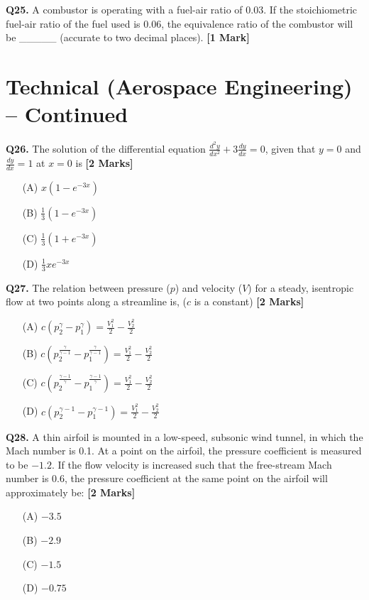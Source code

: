 \documentclass[11pt]{article}
\newcommand{\questiona}[2]{
    \noindent\textbf{Q#2.} #1 \hfill \textbf{[1 Mark]}
}
\newcommand{\questionb}[2]{
    \noindent\textbf{Q#2.} #1 \hfill \textbf{[2 Marks]}
}
\begin{document}
\vspace{0.5cm}

\questiona{A combustor is operating with a fuel-air ratio of 0.03. If the stoichiometric fuel-air ratio of the fuel used is 0.06, the equivalence ratio of the combustor will be \_\_\_\_\_ (accurate to two decimal places).}{25}

\vspace{0.5cm}

\section*{Technical (Aerospace Engineering) -- Continued}

\questionb{The solution of the differential equation $\frac{d^2y}{dx^2} + 3\frac{dy}{dx} = 0$, given that $y = 0$ and $\frac{dy}{dx} = 1$ at $x = 0$ is}{26}
\begin{enumerate}
    \item[(A)] $x(1 - e^{-3x})$  
    \item[(B)] $\frac{1}{3}(1 - e^{-3x})$  
    \item[(C)] $\frac{1}{3}(1 + e^{-3x})$  
    \item[(D)] $\frac{1}{3}xe^{-3x}$  
\end{enumerate}

\vspace{0.5cm}

\questionb{The relation between pressure ($p$) and velocity ($V$) for a steady, isentropic flow at two points along a streamline is, ($c$ is a constant)}{27}
\begin{enumerate}
    \item[(A)] $c(p_2^{\gamma} - p_1^{\gamma}) = \frac{V_1^2}{2} - \frac{V_2^2}{2}$  
    \item[(B)] $c(p_2^{\frac{\gamma}{\gamma-1}} - p_1^{\frac{\gamma}{\gamma-1}}) = \frac{V_1^2}{2} - \frac{V_2^2}{2}$  
    \item[(C)] $c(p_2^{\frac{\gamma - 1}{\gamma}} - p_1^{\frac{\gamma - 1}{\gamma}}) = \frac{V_1^2}{2} - \frac{V_2^2}{2}$  
    \item[(D)] $c(p_2^{\gamma - 1} - p_1^{\gamma - 1}) = \frac{V_1^2}{2} - \frac{V_2^2}{2}$  
\end{enumerate}

\vspace{0.5cm}

\questionb{A thin airfoil is mounted in a low-speed, subsonic wind tunnel, in which the Mach number is 0.1. At a point on the airfoil, the pressure coefficient is measured to be $-1.2$. If the flow velocity is increased such that the free-stream Mach number is 0.6, the pressure coefficient at the same point on the airfoil will approximately be:}{28}
\begin{enumerate}
    \item[(A)] $-3.5$  
    \item[(B)] $-2.9$  
    \item[(C)] $-1.5$  
    \item[(D)] $-0.75$  
\end{enumerate}
\end{document}

